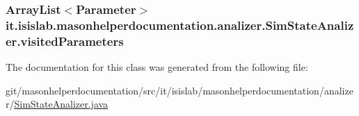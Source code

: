 \hypertarget{classit_1_1isislab_1_1masonhelperdocumentation_1_1analizer_1_1_sim_state_analizer_a5d09f5b05d69fbf599a274dce43934b2}{
\subsubsection[{visited\-Parameters}]{\setlength{\rightskip}{0pt plus 5cm}Array\-List$<${\bf Parameter}$>$ it.\-isislab.\-masonhelperdocumentation.\-analizer.\-Sim\-State\-Analizer.\-visited\-Parameters\hspace{0.3cm}{\ttfamily [private]}}}\label{classit_1_1isislab_1_1masonhelperdocumentation_1_1analizer_1_1_sim_state_analizer_a5d09f5b05d69fbf599a274dce43934b2}


The documentation for this class was generated from the following file\-:\begin{DoxyCompactItemize}
\item 
git/masonhelperdocumentation/src/it/isislab/masonhelperdocumentation/analizer/\hyperlink{_sim_state_analizer_8java}{Sim\-State\-Analizer.\-java}\end{DoxyCompactItemize}
